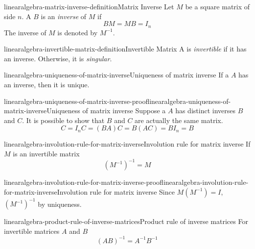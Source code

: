 \documentclass[preview]{standalone}
\begin{document}
\begin{snippetdefinition}{linearalgebra-matrix-inverse-definition}{Matrix Inverse}
    Let \(M\) be a square matrix of side \(n\).
    A \matrix \(B\) is an \textit{inverse}
    of \(M\) if \[BM=MB=I_n\]
    The inverse of \(M\) is denoted by \(M^{-1}\).
\end{snippetdefinition}

\begin{snippetdefinition}{linearalgebra-invertible-matrix-definition}{Invertible Matrix}
    A \matrix is \textit{invertible} if it has an inverse.
    Otherwise, it is \textit{singular}.
\end{snippetdefinition}

\begin{snippetproposition}{linearalgebra-uniqueness-of-matrix-inverse}{Uniqueness of matrix inverse}
    If a \matrix \(A\) has an inverse, then it is unique.
\end{snippetproposition}

\begin{snippetproof}{linearalgebra-uniqueness-of-matrix-inverse-proof}{linearalgebra-uniqueness-of-matrix-inverse}{Uniqueness of matrix inverse}
    Suppose a \matrix \(A\) has distinct inverses \(B\)
    and \(C\).
    It is possible to show that \(B\) and \(C\) are actually
    the same matrix.
    \[
        C=I_n C = (BA) C = B (AC) = BI_n = B
    \]
\end{snippetproof}

\begin{snippetproposition}{linearalgebra-involution-rule-for-matrix-inverse}{Involution rule for matrix inverse}
    If \(M\) is an invertible matrix
    \[
        {(M^{-1})}^{-1} = M
    \]
\end{snippetproposition}

\begin{snippetproof}{linearalgebra-involution-rule-for-matrix-inverse-proof}{linearalgebra-involution-rule-for-matrix-inverse}{Involution rule for matrix inverse}
    Since \(M(M^{-1}) = I\), \({(M^{-1})}^{-1}\)
    by uniqueness. %
\end{snippetproof}

\begin{snippetproposition}{linearalgebra-product-rule-of-inverse-matrices}{Product rule of inverse matrices}
    For invertible matrices \(A\) and \(B\)
    \[
        {(AB)}^{-1} = A^{-1} B^{-1}
    \]
\end{snippetproposition}
\end{document}
